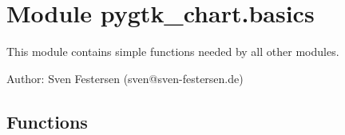 %
%
%


\section{Module pygtk\_chart.basics}

    \label{pygtk_chart:basics}
This module contains simple functions needed by all other modules.

Author: Sven Festersen (sven@sven-festersen.de)



  \subsection{Functions}

    \label{pygtk_chart:basics:is_in_range}

    \vspace{0.5ex}

